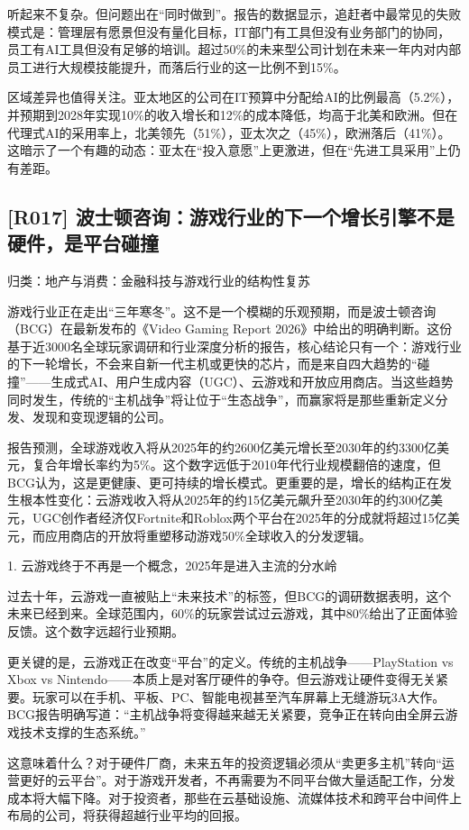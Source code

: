 \documentclass[11pt]{ctexart}
\begin{document}
听起来不复杂。但问题出在“同时做到”。报告的数据显示，追赶者中最常见的失败模式是：管理层有愿景但没有量化目标，IT部门有工具但没有业务部门的协同，员工有AI工具但没有足够的培训。超过50\%的未来型公司计划在未来一年内对内部员工进行大规模技能提升，而落后行业的这一比例不到15\%。

区域差异也值得关注。亚太地区的公司在IT预算中分配给AI的比例最高（5.2\%），并预期到2028年实现10\%的收入增长和12\%的成本降低，均高于北美和欧洲。但在代理式AI的采用率上，北美领先（51\%），亚太次之（45\%），欧洲落后（41\%）。这暗示了一个有趣的动态：亚太在“投入意愿”上更激进，但在“先进工具采用”上仍有差距。

\subsection{[R017] 波士顿咨询：游戏行业的下一个增长引擎不是硬件，是平台碰撞}
{\small\color{refgray}归类：地产与消费：金融科技与游戏行业的结构性复苏}

游戏行业正在走出“三年寒冬”。这不是一个模糊的乐观预期，而是波士顿咨询（BCG）在最新发布的《Video Gaming Report 2026》中给出的明确判断。这份基于近3000名全球玩家调研和行业深度分析的报告，核心结论只有一个：游戏行业的下一轮增长，不会来自新一代主机或更快的芯片，而是来自四大趋势的“碰撞”——生成式AI、用户生成内容（UGC）、云游戏和开放应用商店。当这些趋势同时发生，传统的“主机战争”将让位于“生态战争”，而赢家将是那些重新定义分发、发现和变现逻辑的公司。

报告预测，全球游戏收入将从2025年的约2600亿美元增长至2030年的约3300亿美元，复合年增长率约为5\%。这个数字远低于2010年代行业规模翻倍的速度，但BCG认为，这是更健康、更可持续的增长模式。更重要的是，增长的结构正在发生根本性变化：云游戏收入将从2025年的约15亿美元飙升至2030年的约300亿美元，UGC创作者经济仅Fortnite和Roblox两个平台在2025年的分成就将超过15亿美元，而应用商店的开放将重塑移动游戏50\%全球收入的分发逻辑。

1. 云游戏终于不再是一个概念，2025年是进入主流的分水岭

过去十年，云游戏一直被贴上“未来技术”的标签，但BCG的调研数据表明，这个未来已经到来。全球范围内，60\%的玩家尝试过云游戏，其中80\%给出了正面体验反馈。这个数字远超行业预期。

更关键的是，云游戏正在改变“平台”的定义。传统的主机战争——PlayStation vs Xbox vs Nintendo——本质上是对客厅硬件的争夺。但云游戏让硬件变得无关紧要。玩家可以在手机、平板、PC、智能电视甚至汽车屏幕上无缝游玩3A大作。BCG报告明确写道：“主机战争将变得越来越无关紧要，竞争正在转向由全屏云游戏技术支撑的生态系统。”

这意味着什么？对于硬件厂商，未来五年的投资逻辑必须从“卖更多主机”转向“运营更好的云平台”。对于游戏开发者，不再需要为不同平台做大量适配工作，分发成本将大幅下降。对于投资者，那些在云基础设施、流媒体技术和跨平台中间件上布局的公司，将获得超越行业平均的回报。
\end{document}
